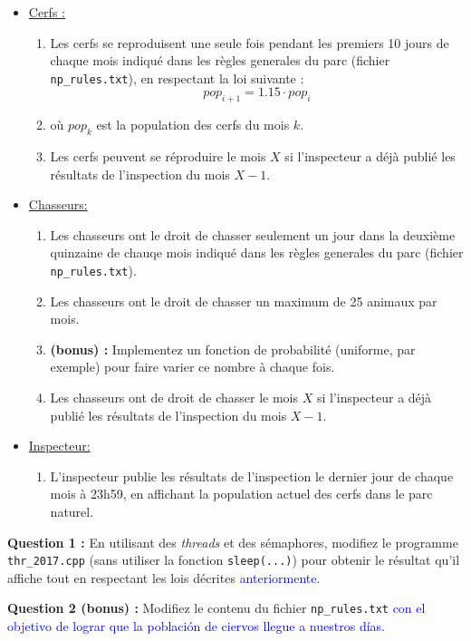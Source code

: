 \documentclass[CC,sansRappel,12pt]{tdtp-utf8}
\newcommand{\totranslate}[1]{\textcolor{blue}{#1}}
\newcommand{\tocorrect}[1]{\textcolor{dgreen}{#1}}
\begin{document}
\begin{feuille}
\begin{exercice}
\begin{itemize}
\item \underline{Cerfs :}
\begin{enumerate}
\item Les cerfs \tocorrect{se reproduisent une seule fois pendant les premiers 10 jours de chaque mois indiqué dans les règles generales du parc (fichier \texttt{np\_rules.txt}), en respectant la loi suivante :} $$pop_{i+1} = 1.15\cdot pop_{i}$$
\item[] où $pop_k$ est la population des cerfs du mois $k$.
\item Les cerfs \tocorrect{peuvent se réproduire le mois $X$ si l'inspecteur a déjà publié les résultats de l'inspection du mois $X-1$}.
\end{enumerate}
\item \underline{Chasseurs:}
\begin{enumerate}
\item Les chasseurs \tocorrect{ont le droit de chasser seulement un jour dans la deuxième quinzaine de chauqe mois indiqué dans les règles generales du parc (fichier \texttt{np\_rules.txt}).}
\item Les chasseurs \tocorrect{ont le droit de chasser un maximum de 25 animaux par mois.}
\item[] \textbf{(bonus) : } \tocorrect{Implementez un fonction de probabilité (uniforme, par exemple) pour faire varier ce nombre à chaque fois.}
\item Les chasseurs \tocorrect{ont de droit de chasser le mois $X$ si l'inspecteur a déjà publié les résultats de l'inspection du mois $X-1$.}
\end{enumerate}
\item \underline{Inspecteur:}
\begin{enumerate}
\item L'inspecteur \tocorrect{publie les résultats de l'inspection le dernier jour de chaque mois à 23h59, en affichant la population actuel des cerfs dans le parc naturel.}
\end{enumerate}
\end{itemize}

\textbf{Question 1 : } \tocorrect{En utilisant des \textit{threads} et des sémaphores, modifiez le programme \texttt{thr\_2017.cpp} (sans utiliser la fonction \texttt{sleep(...)}) pour obtenir le résultat qu'il affiche tout en respectant les lois décrites} \totranslate{anteriormente}.

\textbf{Question 2 (bonus) :} \tocorrect{Modifiez le contenu du fichier \texttt{np\_rules.txt} } \totranslate{con el objetivo de lograr que la población de ciervos llegue a nuestros días.}


\end{exercice}
\end{feuille}
\end{document}
